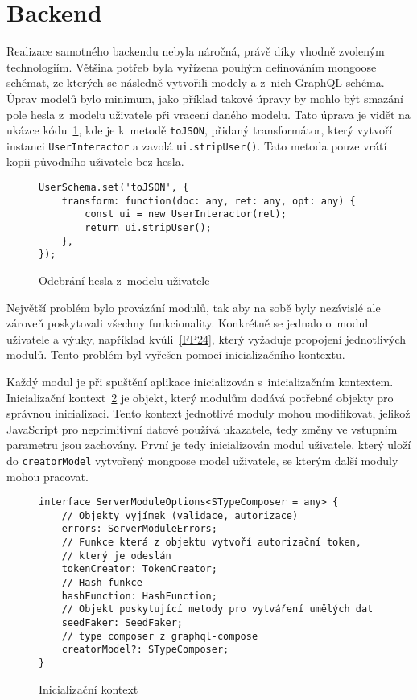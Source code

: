 \section{Backend}
\label{sc:backend}
Realizace samotného backendu nebyla náročná, právě díky vhodně zvoleným technologiím. Většina potřeb byla vyřízena pouhým definováním mongoose schémat, ze kterých se následně vytvořili modely a z~nich GraphQL schéma. Úprav modelů bylo minimum, jako příklad takové úpravy by mohlo být smazání pole hesla z~modelu uživatele při vracení daného modelu. Tato úprava je vidět na ukázce kódu~\ref{code:to_json_user}, kde je k~metodě \texttt{toJSON}, přidaný transformátor, který vytvoří instanci \texttt{UserInteractor} a zavolá \texttt{ui.stripUser()}. Tato metoda pouze vrátí kopii původního uživatele bez hesla.

\begin{figure}[h!]
    \centering
    \begin{verbatim}
UserSchema.set('toJSON', {
    transform: function(doc: any, ret: any, opt: any) {
        const ui = new UserInteractor(ret);
        return ui.stripUser();
    },
});
    \end{verbatim}
    \caption{Odebrání hesla z~modelu uživatele}
    \label{code:to_json_user}
\end{figure}

Největší problém bylo provázání modulů, tak aby na sobě byly nezávislé ale zároveň poskytovali všechny funkcionality. Konkrétně se jednalo o~modul uživatele a výuky, například kvůli~\ref{FP24}, který vyžaduje propojení jednotlivých modulů. Tento problém byl vyřešen pomocí inicializačního kontextu.

Každý modul je při spuštění aplikace inicializován s~inicializačním kontextem. Inicializační kontext~\ref{code:server_module_options} je objekt, který modulům dodává potřebné objekty pro správnou inicializaci. Tento kontext jednotlivé moduly mohou modifikovat, jelikož JavaScript pro neprimitivní datové používá ukazatele, tedy změny ve vstupním parametru jsou zachovány. První je tedy inicializován modul uživatele, který uloží do \texttt{creatorModel} vytvořený mongoose model uživatele, se kterým další moduly mohou pracovat.

\begin{figure}[h!]
    \centering
    \begin{verbatim}
interface ServerModuleOptions<STypeComposer = any> {
    // Objekty vyjímek (validace, autorizace)
    errors: ServerModuleErrors;
    // Funkce která z objektu vytvoří autorizační token,
    // který je odeslán
    tokenCreator: TokenCreator;
    // Hash funkce
    hashFunction: HashFunction; 
    // Objekt poskytující metody pro vytváření umělých dat
    seedFaker: SeedFaker;
    // type composer z graphql-compose
    creatorModel?: STypeComposer; 
}
    \end{verbatim}
    \caption{Inicializační kontext}
    \label{code:server_module_options}
\end{figure}

